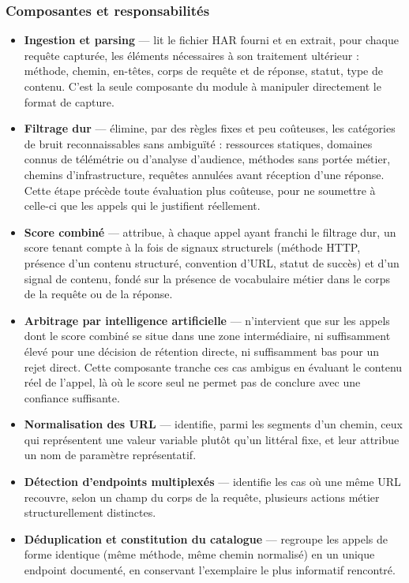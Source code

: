 \subsubsection{Composantes et responsabilités}

\begin{itemize}
    \item \textbf{Ingestion et parsing} — lit le fichier HAR fourni et en extrait, pour chaque requête capturée, les éléments nécessaires à son traitement ultérieur : méthode, chemin, en-têtes, corps de requête et de réponse, statut, type de contenu. C'est la seule composante du module à manipuler directement le format de capture.
    \item \textbf{Filtrage dur} — élimine, par des règles fixes et peu coûteuses, les catégories de bruit reconnaissables sans ambiguïté : ressources statiques, domaines connus de télémétrie ou d'analyse d'audience, méthodes sans portée métier, chemins d'infrastructure, requêtes annulées avant réception d'une réponse. Cette étape précède toute évaluation plus coûteuse, pour ne soumettre à celle-ci que les appels qui le justifient réellement.
    \item \textbf{Score combiné} — attribue, à chaque appel ayant franchi le filtrage dur, un score tenant compte à la fois de signaux structurels (méthode HTTP, présence d'un contenu structuré, convention d'URL, statut de succès) et d'un signal de contenu, fondé sur la présence de vocabulaire métier dans le corps de la requête ou de la réponse.
    \item \textbf{Arbitrage par intelligence artificielle} — n'intervient que sur les appels dont le score combiné se situe dans une zone intermédiaire, ni suffisamment élevé pour une décision de rétention directe, ni suffisamment bas pour un rejet direct. Cette composante tranche ces cas ambigus en évaluant le contenu réel de l'appel, là où le score seul ne permet pas de conclure avec une confiance suffisante.
    \item \textbf{Normalisation des URL} — identifie, parmi les segments d'un chemin, ceux qui représentent une valeur variable plutôt qu'un littéral fixe, et leur attribue un nom de paramètre représentatif.
    \item \textbf{Détection d'endpoints multiplexés} — identifie les cas où une même URL recouvre, selon un champ du corps de la requête, plusieurs actions métier structurellement distinctes.
    \item \textbf{Déduplication et constitution du catalogue} — regroupe les appels de forme identique (même méthode, même chemin normalisé) en un unique endpoint documenté, en conservant l'exemplaire le plus informatif rencontré.
\end{itemize}

